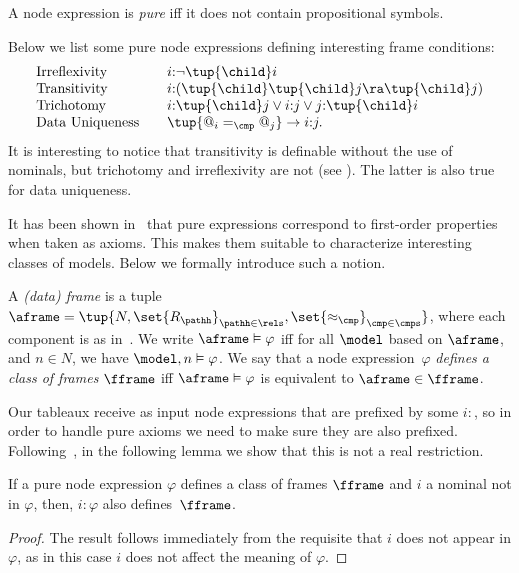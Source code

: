 \begin{defi}\label{def:pure}
    A node expression is \emph{pure} iff it does not contain propositional symbols.
\end{defi}

\begin{exa}\label{ex:pure}
 Below we list some pure node expressions defining interesting frame conditions:
 \[
 \begin{array}{l@{\quad\quad}l}
    \text{Irreflexivity}  &  i{:}\neg \tup{\child} i \\
    \text{Transitivity} &  i{:}(\tup{\child}\tup{\child}j \ra \tup{\child}j) \\
    \text{Trichotomy} & i{:}\tup{\child} j \lor i{:}j \lor j{:}\tup{\child}i\\
    \text{Data Uniqueness} & \tup{@_i =_\cmp @_j} \to i{:} j .
 \end{array}
 \]
 It is interesting to notice that transitivity is definable without the use of nominals,  but trichotomy and irreflexivity are not (see \cite{Blackburn00}). The latter is also true for data uniqueness.
\end{exa}

It has been shown in~\cite{ArecesF21} that pure expressions correspond to first-order properties when taken as axioms. This makes them suitable to characterize interesting classes of models. Below we formally introduce such a notion.

\begin{defi}
    A \emph{(data) frame} is a tuple $\aframe = \tup{N, \set{R_\pathh}_{\pathh \in \rels}, \set{\approx_{\cmp}}_{\cmp\in\cmps}}$, where each component is as in~.
    We write $\aframe\vDash\varphi$ iff for all $\model$ based on $\aframe$, and $n \in N$, we have $\model,n \vDash \varphi$.
    We say that a node expression~$\varphi$ \emph{defines a class of frames $\fframe$} iff $\aframe\vDash\varphi$ is equivalent to  $\aframe\in\fframe$. 
\end{defi}

Our tableaux receive as input node expressions that are prefixed by some $i{:}$, so in order to handle pure axioms we need to make sure they are also prefixed. Following~\cite{Blackburn00,Blackburn2002BeyondPA}, in the following lemma we show that this is not a real restriction.

\begin{lem}\label{lemma:defines}
 If a pure node expression $\varphi$ defines a class of frames $\fframe$ and $i$ a nominal not in $\varphi$, then, $i{:}\varphi$ also defines~$\fframe$.
\end{lem}
\begin{proof}
    The result follows immediately from the requisite that $i$ does not appear in $\varphi$, as in this case $i$ does not affect the meaning of $\varphi$.
\end{proof}

